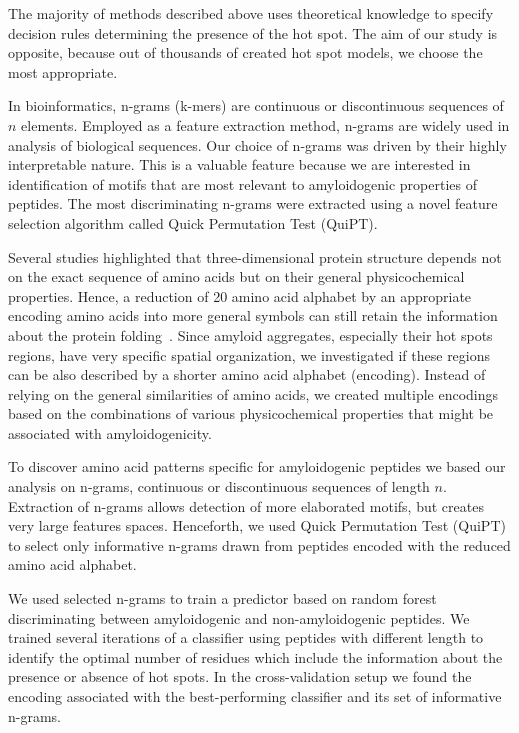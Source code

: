 \documentclass[a4,center,fleqn]{NAR}
\begin{document}
\enlargethispage{-65.1pt}

  The majority of methods described above uses theoretical knowledge to 
specify decision rules determining the presence of the hot spot. The aim of our 
study is opposite, because out of thousands of created hot spot models, we choose 
the most appropriate.
  
  In bioinformatics, n-grams (k-mers) are continuous or discontinuous sequences of 
$n$ elements. Employed as a feature extraction method, n-grams are widely used 
in analysis of biological sequences. Our choice of n-grams was driven by their 
highly interpretable nature. This is a valuable feature because we are 
interested in identification of motifs that are most relevant to amyloidogenic 
properties of peptides. The most discriminating n-grams were extracted using a 
novel feature selection algorithm called Quick Permutation Test (QuiPT).

  Several studies highlighted that three-dimensional protein structure depends 
not on the exact sequence of amino acids but on their general physicochemical 
properties. Hence, a reduction of 20 amino acid alphabet by an appropriate encoding 
amino acids into more general symbols can still retain the information about the 
protein folding~\citep{murphy_simplified_2000}. Since amyloid aggregates, 
especially their hot spots regions, have very specific spatial organization, we 
investigated if these regions can be also described by a shorter amino acid alphabet
(encoding). Instead of relying on the general similarities of amino acids, we created 
multiple encodings based on the combinations of various physicochemical properties that 
might be associated with amyloidogenicity.  

  To discover amino acid patterns specific for amyloidogenic peptides we based our 
analysis on n-grams, continuous or discontinuous sequences of length $n$. Extraction of 
n-grams allows detection of more elaborated motifs, but creates very large features spaces. 
Henceforth, we used Quick Permutation Test (QuiPT) to select only informative n-grams 
drawn from peptides encoded with the reduced amino acid alphabet.

  We used selected n-grams to train a predictor based on random forest~\citep{breiman_random_2001}
discriminating between amyloidogenic and non-amyloidogenic peptides. We trained several iterations of a 
classifier using peptides with different length to identify the optimal number of 
residues which include the information about the presence or absence of hot spots. 
In the cross-validation setup we found the encoding associated with the best-performing 
classifier and its set of informative n-grams.
\end{document}
